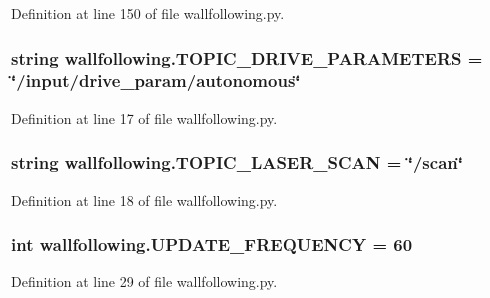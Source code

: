 Definition at line 150 of file wallfollowing.\+py.

\subsubsection[{\texorpdfstring{T\+O\+P\+I\+C\+\_\+\+D\+R\+I\+V\+E\+\_\+\+P\+A\+R\+A\+M\+E\+T\+E\+RS}{TOPIC_DRIVE_PARAMETERS}}]{\setlength{\rightskip}{0pt plus 5cm}string wallfollowing.\+T\+O\+P\+I\+C\+\_\+\+D\+R\+I\+V\+E\+\_\+\+P\+A\+R\+A\+M\+E\+T\+E\+RS = \char`\"{}/input/drive\+\_\+param/autonomous\char`\"{}}\hypertarget{namespacewallfollowing_a765ce45df7d0c3d9134fc83534029e36}{}\label{namespacewallfollowing_a765ce45df7d0c3d9134fc83534029e36}


Definition at line 17 of file wallfollowing.\+py.

\subsubsection[{\texorpdfstring{T\+O\+P\+I\+C\+\_\+\+L\+A\+S\+E\+R\+\_\+\+S\+C\+AN}{TOPIC_LASER_SCAN}}]{\setlength{\rightskip}{0pt plus 5cm}string wallfollowing.\+T\+O\+P\+I\+C\+\_\+\+L\+A\+S\+E\+R\+\_\+\+S\+C\+AN = \char`\"{}/scan\char`\"{}}\hypertarget{namespacewallfollowing_a7e38e617465ebdfa7ec0576ac63443f8}{}\label{namespacewallfollowing_a7e38e617465ebdfa7ec0576ac63443f8}


Definition at line 18 of file wallfollowing.\+py.

\subsubsection[{\texorpdfstring{U\+P\+D\+A\+T\+E\+\_\+\+F\+R\+E\+Q\+U\+E\+N\+CY}{UPDATE_FREQUENCY}}]{\setlength{\rightskip}{0pt plus 5cm}int wallfollowing.\+U\+P\+D\+A\+T\+E\+\_\+\+F\+R\+E\+Q\+U\+E\+N\+CY = 60}\hypertarget{namespacewallfollowing_a7ba7bea964894fd6f3def270bd3afa43}{}\label{namespacewallfollowing_a7ba7bea964894fd6f3def270bd3afa43}


Definition at line 29 of file wallfollowing.\+py.

